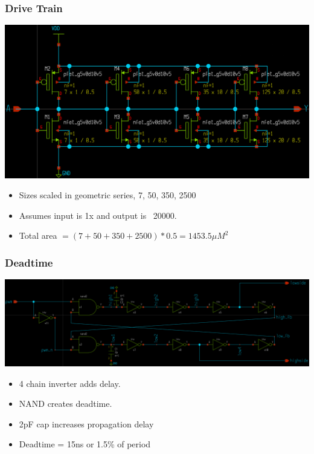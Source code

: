 \documentclass{beamer}
\begin{document}
\begin{frame}
  \frametitle{Drive Train}
  \includegraphics[scale=0.08]{drive-train.png}
  \begin{itemize}
  \item Sizes scaled in geometric series, 7, 50, 350, 2500
  \item Assumes input is 1x and output is ~20000.
  \item Total area $= (7 + 50 + 350 + 2500) * 0.5 = 1453.5 \mu M^2$
  \end{itemize}
\end{frame}

\begin{frame}
  \frametitle{Deadtime}
  \includegraphics[scale=0.085]{deadtime.png}
  \begin{itemize}
  \item 4 chain inverter adds delay.
  \item NAND creates deadtime.
  \item 2pF cap increases propagation delay
  \item Deadtime = 15ns or 1.5\%  of period
  \end{itemize}
\end{frame}
\end{document}
